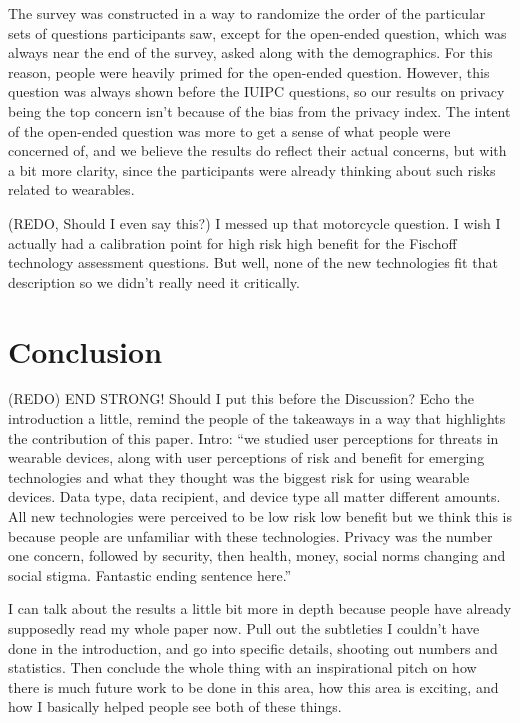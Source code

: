 \documentclass{acm_proc_article-sp}
\begin{document}
The survey was constructed in a way to randomize the order of the particular sets of questions participants saw, except for the open-ended question, which was always near the end of the survey, asked along with the demographics. For this reason, people were heavily primed for the open-ended question. However, this question was always shown before the IUIPC questions, so our results on privacy being the top concern isn't because of the bias from the privacy index. The intent of the open-ended question  was more to get a sense of what people were concerned of, and we believe the results do reflect their actual concerns, but with a bit more clarity, since the participants were already thinking about such risks related to wearables. 

(REDO, Should I even say this?) I messed up that motorcycle question. I wish I actually had a calibration point for high risk high benefit for the Fischoff technology assessment questions. But well, none of the new technologies fit that description so we didn't really need it critically. 


\section{Conclusion}
(REDO) END STRONG! Should I put this before the Discussion?  Echo the introduction a little, remind the people of the takeaways in a way that highlights the contribution of this paper. Intro: ``we studied user perceptions for threats in wearable devices, along with user perceptions of risk and benefit for emerging technologies and what they thought was the biggest risk for using wearable devices. Data type, data recipient, and device type all matter different amounts. All new technologies were perceived to be low risk low benefit but we think this is because people are unfamiliar with these technologies. Privacy was the number one concern, followed by security, then health, money, social norms changing and social stigma. Fantastic ending sentence here.''

I can talk about the results a little bit more in depth because people have already supposedly read my whole paper now. Pull out the subtleties I couldn't have done in the introduction, and go into specific details, shooting out numbers and statistics. Then conclude the whole thing with an inspirational pitch on how there is much future work to be done in this area, how this area is exciting, and how I basically helped people see both of these things. 
\end{document}
